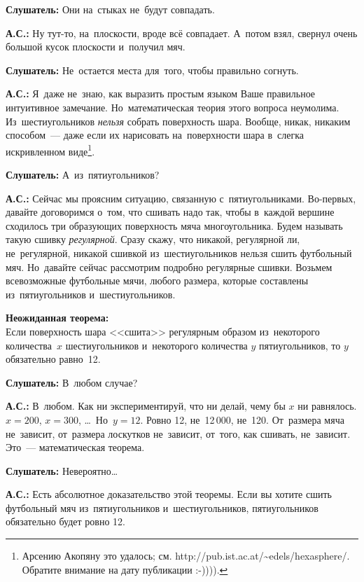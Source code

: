 \textbf{Слушатель:} Они на~стыках не~будут совпадать.

\textbf{А.С.:} Ну тут-то, на~плоскости, вроде всё совпадает. А~потом взял, свернул очень большой
кусок плоскости и~получил мяч.

\textbf{Слушатель:} Не~остается места для~того, чтобы правильно согнуть.

\textbf{А.С.:} Я~даже не~знаю, как выразить простым языком Ваше правильное интуитивное замечание.
Но~математическая теория этого вопроса неумолима. Из~шестиугольников \textit{нельзя} собрать поверхность
шара. Вообще, никак, никаким способом~--- даже если их нарисовать на~поверхности шара в~слегка
искривленном виде\footnote{Арсению Акопяну это удалось; см. http://pub.ist.ac.at/\allowbreak\textasciitilde edels/\allowbreak hexasphere/. Обратите внимание на дату публикации :-)))).}.

\textbf{Слушатель:} А~из~пятиугольников?

\textbf{А.С.:} Сейчас мы проясним ситуацию, связанную с~пятиугольниками. Во-первых, давайте договоримся
о~том, что сшивать надо так, чтобы в~каждой вершине сходилось три образующих поверхность
мяча многоугольника. Будем называть такую сшивку \textit{регулярной}.
Сразу скажу, что никакой,
регулярной ли, не~регулярной, никакой сшивкой из~шестиугольников нельзя сшить футбольный мяч.
Но~давайте сейчас рассмотрим подробно регулярные сшивки. Возьмем всевозможные футбольные мячи,
любого размера, которые составлены из~пятиугольников и~шестиугольников.

\smallskip

\textbf{Неожиданная теорема:}\\
Если поверхность шара <<сшита>> регулярным образом из~некоторого количества~$x$ шестиугольников и~некоторого количества $y$ пятиугольников,
то $y$ обязательно равно~12.

\smallskip

\textbf{Слушатель:} В~любом случае?

\textbf{А.С.:} В~любом. Как ни экспериментируй, что ни делай, чему бы $x$ ни равнялось. $x=200$, $x=300$, \ldots\
Но~$y=12$. Ровно 12, не~12\,000, не~120. От~размера мяча не~зависит, от~размера лоскутков
не~зависит, от~того, как сшивать, не~зависит.
 Это~--- математическая теорема.

\textbf{Слушатель:} Невероятно\ldots

\textbf{А.С.:} Есть абсолютное доказательство этой теоремы. Если вы хотите сшить футбольный мяч
из~пятиугольников и~шестиугольников, пятиугольников обязательно будет ровно 12.

